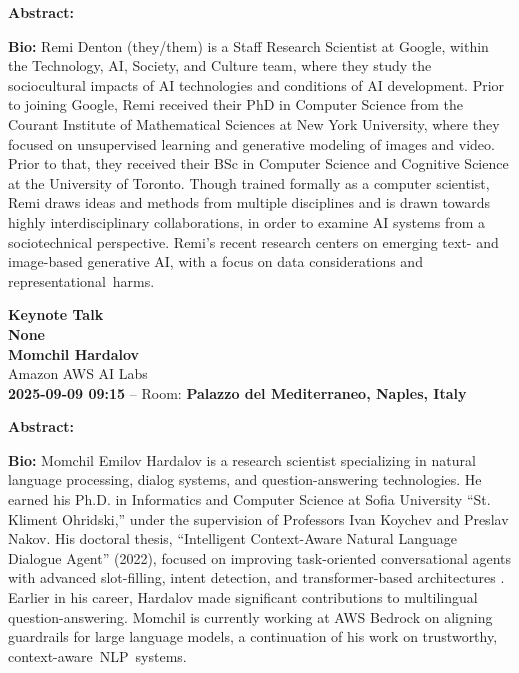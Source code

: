 \documentclass[11pt,oneside]{book}
\begin{document}
  \vspace*{0.2cm}
    \textbf{Abstract:} %
  \newline
  
    \textbf{Bio:} Remi Denton (they/them) is a Staff Research Scientist at Google, within the Technology, AI, Society, and Culture team, where they study the sociocultural impacts of AI technologies and conditions of AI development. Prior to joining Google, Remi received their PhD in Computer Science from the Courant Institute of Mathematical Sciences at New York University, where they focused on unsupervised learning and generative modeling of images and video. Prior to that, they received their BSc in Computer Science and Cognitive Science at the University of Toronto. Though trained formally as a computer scientist, Remi draws ideas and methods from multiple disciplines and is drawn towards highly interdisciplinary collaborations, in order to examine AI systems from a sociotechnical perspective.  Remi’s recent research centers on emerging text- and image-based generative AI, with a focus on data considerations and representational harms.
  \newpage
  \begin{center}
          {\Large \textbf{Keynote Talk}\\}
      {\LARGE \textbf{None}\\}
        \vspace*{0.5cm}
    \textbf{Momchil Hardalov}\\
        Amazon AWS AI Labs\\
        
        
        \textbf{2025-09-09 09:15} -- 
                Room: \textbf{Palazzo del Mediterraneo, Naples, Italy}\\
        
  \end{center}

  \vspace*{0.2cm}
    \textbf{Abstract:} %
  \newline
  
    \textbf{Bio:} Momchil Emilov Hardalov is a research scientist specializing in natural language processing, dialog systems, and question-answering technologies. He earned his Ph.D. in Informatics and Computer Science at Sofia University “St. Kliment Ohridski,” under the supervision of Professors Ivan Koychev and Preslav Nakov. His doctoral thesis, “Intelligent Context-Aware Natural Language Dialogue Agent” (2022), focused on improving task-oriented conversational agents with advanced slot-filling, intent detection, and transformer-based architectures . Earlier in his career, Hardalov made significant contributions to multilingual question-answering. Momchil is currently working at AWS Bedrock on aligning guardrails for large language models, a continuation of his work on trustworthy, context-aware NLP systems.
  \newpage
  
\end{document}
